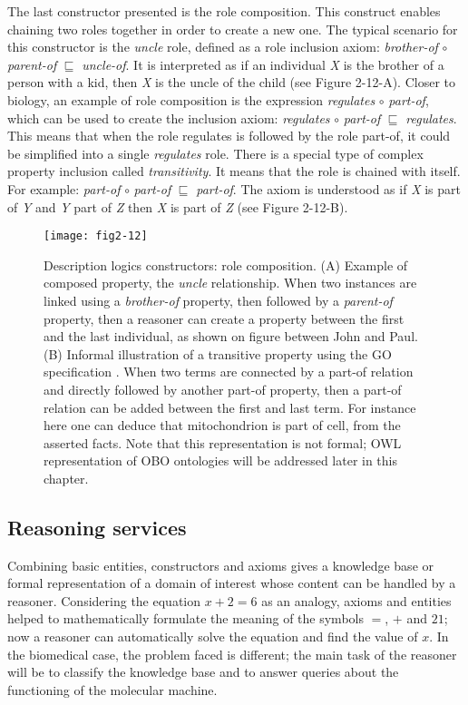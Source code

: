 The last constructor presented is the role composition. This construct enables chaining two roles together in order to create a new one. The typical scenario for this constructor is the \emph{uncle} role, defined as a role inclusion axiom: \emph{brother-of} $ \circ $ \emph{parent-of} $ \sqsubseteq $ \emph{uncle-of}. It is interpreted as if an individual \emph{X} is the brother of a person with a kid, then \emph{X} is the uncle of the child (see Figure 2-12-A). Closer to biology, an example of role composition is the expression \emph{regulates} $ \circ $ \emph{part-of}, which can be used to create the inclusion axiom: \emph{regulates} $ \circ $ \emph{part-of} $ \sqsubseteq $ \emph{regulates}. This means that when the role regulates is followed by the role part-of, it could be simplified into a single \emph{regulates} role. There is a special type of complex property inclusion called \emph{transitivity}. It means that the role is chained with itself. For example: \emph{part-of} $ \circ $ \emph{part-of} $ \sqsubseteq $ \emph{part-of}. The axiom is understood as if \emph{X} is part of \emph{Y} and \emph{Y} part of \emph{Z} then \emph{X} is part of \emph{Z} (see Figure 2-12-B).

\begin{figure}[ht]
    \centering
    \texttt{[image: fig2-12]}
    \caption{Description logics constructors: role composition. (A) Example of composed property, the \emph{uncle} relationship. When two instances are linked using a \emph{brother-of} property, then followed by a \emph{parent-of} property, then a reasoner can create a property between the first and the last individual, as shown on figure between John and Paul. (B) Informal illustration of a transitive property using the GO specification \citep{gorels}. When two terms are connected by a part-of relation and directly followed by another part-of property, then a part-of relation can be added between the first and last term. For instance here one can deduce that mitochondrion is part of cell, from the asserted facts. Note that this representation is not formal; OWL representation of OBO ontologies will be addressed later in this chapter.}
    \label{fig2-12}
\end{figure}

\subsection{Reasoning services}

Combining basic entities, constructors and axioms gives a knowledge base or formal representation of a domain of interest whose content can be handled by a reasoner. Considering the equation $ x + 2 = 6 $ as an analogy, axioms and entities helped to mathematically formulate the meaning of the symbols $ = $, $ + $ and $ 21 $; now a reasoner can automatically solve the equation and find the value of $ x $. In the biomedical case, the problem faced is different; the main task of the reasoner will be to classify the knowledge base and to answer queries about the functioning of the molecular machine.

